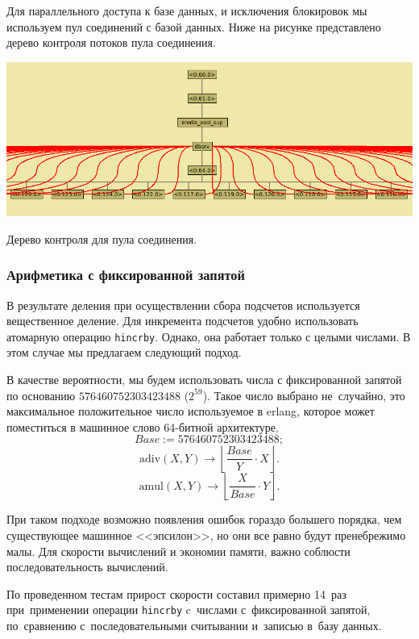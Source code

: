 Для параллельного доступа к базе данных, и исключения блокировок 
мы используем пул соединений с базой данных.
Ниже на рисунке представлено дерево контроля потоков пула соединения. 

\begin{figured}
	\includegraphics[width=16cm]{./img/practice-dbpool.png}
	\caption{Дерево контроля для пула соединения.}
\end{figured}

\pagebreak

\subsubsection{Арифметика с фиксированной запятой}

В результате деления при осуществлении сбора подсчетов используется вещественное деление.
Для инкремента подсчетов удобно использовать атомарную операцию {\tt hincrby}.
Однако, она работает только с целыми числами. В этом случае мы предлагаем следующий подход.

В качестве вероятности, мы будем использовать числа с фиксированной запятой
по основанию $576460752303423488$ ($2^{59}$). Такое число выбрано не~случайно,
это максимальное положительное число используемое в erlang,
которое может поместиться в машинное слово 64-битной архитектуре.
\[
	Base := 576460752303423488;
\]
\[
	\mathrm{adiv}(X, Y)	\rightarrow \left\lfloor \dfrac{Base}{Y} \cdot X \right\rfloor.
\]
\[
	\mathrm{amul}(X, Y)	\rightarrow \left\lfloor \dfrac{X}{Base } \cdot Y \right\rfloor.
\]

При таком подходе возможно появления ошибок гораздо большего порядка, 
чем существующее машинное <<эпсилон>>, но они все равно будут пренебрежимо малы.
Для скорости вычислений и экономии памяти, важно соблюсти
последовательность вычислений.

По проведенном тестам прирост скорости составил примерно 14~раз при~применении 
операции {\tt hincrby} c~числами с~фиксированной запятой, по~сравнению с~последовательными
считывании и~записью в~базу данных.

